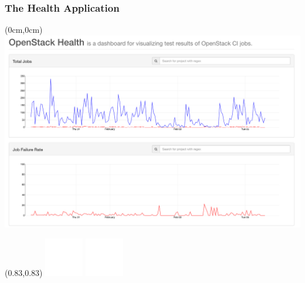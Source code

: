 \documentclass[aspectratio=169,11pt,hyperref={colorlinks=true}]{beamer}
\begin{document}
\begin{lblackrwhiteframe}
\begin{blackframe}
\begin{grayframe}
  \frametitle{The Health Application}
  \begin{textblock*}{\paperwidth}(0cm,0cm)
    \includegraphics[width=\paperwidth, height=\paperheight]{img/openstack-health.png}
  \end{textblock*}
  \begin{textblock*}{0.2\paperwidth}(0.83\paperwidth,0.83\paperheight)
    \includegraphics[width=0.03\paperwidth]{img/cc.png}
    \includegraphics[width=0.03\paperwidth]{img/zero.png}
  \end{textblock*}
\end{grayframe}


\end{blackframe}
\end{lblackrwhiteframe}
\end{document}
